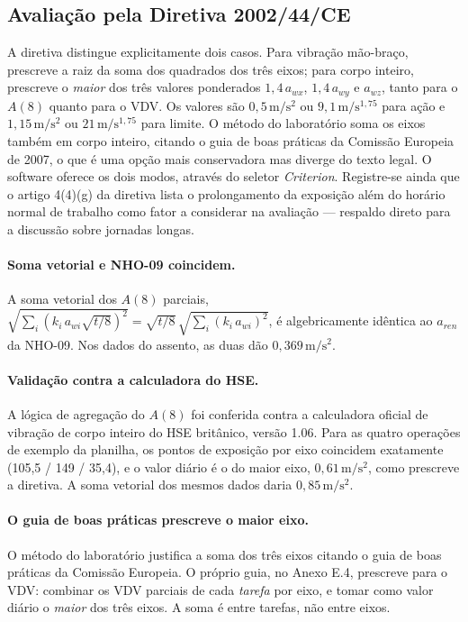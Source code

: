 \documentclass[11pt,a4paper]{article}
\newcommand{\unit}[2]{\ensuremath{#1\,\mathrm{#2}}}
\begin{document}
\subsection{Avaliação pela Diretiva 2002/44/CE}

A diretiva distingue explicitamente dois casos. Para vibração mão-braço,
prescreve a raiz da soma dos quadrados dos três eixos; para corpo inteiro,
prescreve o \emph{maior} dos três valores ponderados $1{,}4\,a_{wx}$,
$1{,}4\,a_{wy}$ e $a_{wz}$, tanto para o $A(8)$ quanto para o VDV. Os valores são
\unit{0{,}5}{m/s^2} ou \unit{9{,}1}{m/s^{1{,}75}} para ação e
\unit{1{,}15}{m/s^2} ou \unit{21}{m/s^{1{,}75}} para limite. O método do
laboratório soma os eixos também em corpo inteiro, citando o guia de boas
práticas da Comissão Europeia de 2007, o que é uma opção mais conservadora mas
diverge do texto legal. O software oferece os dois modos, através do seletor
\emph{Criterion}. Registre-se ainda que o artigo 4(4)(g) da diretiva lista o
prolongamento da exposição além do horário normal de trabalho como fator a
considerar na avaliação --- respaldo direto para a discussão sobre jornadas
longas.

\paragraph{Soma vetorial e NHO-09 coincidem.} A soma vetorial dos $A(8)$ parciais,
$\sqrt{\sum_i (k_i\,a_{wi}\sqrt{t/8})^2} = \sqrt{t/8}\,\sqrt{\sum_i (k_i\,a_{wi})^2}$,
é algebricamente idêntica ao $a_{ren}$ da NHO-09. Nos dados do assento, as duas
dão \unit{0{,}369}{m/s^2}.

\paragraph{Validação contra a calculadora do HSE.} A lógica de agregação do $A(8)$
foi conferida contra a calculadora oficial de vibração de corpo inteiro do HSE
britânico, versão 1.06. Para as quatro operações de exemplo da planilha, os
pontos de exposição por eixo coincidem exatamente (105,5 / 149 / 35,4), e o
valor diário é o do maior eixo, \unit{0{,}61}{m/s^2}, como prescreve a diretiva.
A soma vetorial dos mesmos dados daria \unit{0{,}85}{m/s^2}.

\paragraph{O guia de boas práticas prescreve o maior eixo.} O método do
laboratório justifica a soma dos três eixos citando o guia de boas práticas da
Comissão Europeia. O próprio guia, no Anexo E.4, prescreve para o VDV: combinar
os VDV parciais de cada \emph{tarefa} por eixo, e tomar como valor diário o
\emph{maior} dos três eixos. A soma é entre tarefas, não entre eixos.
\end{document}
